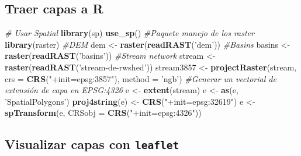 \documentclass[11pt,]{article}
\newenvironment{Shaded}{\begin{snugshade}}{\end{snugshade}}
\newcommand{\KeywordTok}[1]{\textcolor[rgb]{0.13,0.29,0.53}{\textbf{#1}}}
\newcommand{\DataTypeTok}[1]{\textcolor[rgb]{0.13,0.29,0.53}{#1}}
\newcommand{\StringTok}[1]{\textcolor[rgb]{0.31,0.60,0.02}{#1}}
\newcommand{\CommentTok}[1]{\textcolor[rgb]{0.56,0.35,0.01}{\textit{#1}}}
\newcommand{\NormalTok}[1]{#1}
\begin{document}
\subsection{Traer capas a R}\label{traer-capas-a-r}

\begin{Shaded}
\begin{Highlighting}[]
\CommentTok{# Usar Spatial }
\KeywordTok{library}\NormalTok{(sp)}
\KeywordTok{use_sp}\NormalTok{()}
\CommentTok{#Paquete manejo de los raster}
\KeywordTok{library}\NormalTok{(raster)}
\CommentTok{#DEM}
\NormalTok{dem <-}\StringTok{ }\KeywordTok{raster}\NormalTok{(}\KeywordTok{readRAST}\NormalTok{(}\StringTok{'dem'}\NormalTok{))}
\CommentTok{#Basins}
\NormalTok{basins <-}\StringTok{ }\KeywordTok{raster}\NormalTok{(}\KeywordTok{readRAST}\NormalTok{(}\StringTok{'basins'}\NormalTok{))}
\CommentTok{#Stream network}
\NormalTok{stream <-}\StringTok{ }\KeywordTok{raster}\NormalTok{(}\KeywordTok{readRAST}\NormalTok{(}\StringTok{'stream-de-rwshed'}\NormalTok{))}
\NormalTok{stream3857 <-}\StringTok{ }\KeywordTok{projectRaster}\NormalTok{(stream, }\DataTypeTok{crs =} \KeywordTok{CRS}\NormalTok{(}\StringTok{"+init=epsg:3857"}\NormalTok{), }\DataTypeTok{method =} \StringTok{'ngb'}\NormalTok{)}
\CommentTok{#Generar un vectorial de extensión de capa en EPSG:4326}
\NormalTok{e <-}\StringTok{ }\KeywordTok{extent}\NormalTok{(stream)}
\NormalTok{e <-}\StringTok{ }\KeywordTok{as}\NormalTok{(e, }\StringTok{'SpatialPolygons'}\NormalTok{)}
\KeywordTok{proj4string}\NormalTok{(e) <-}\StringTok{ }\KeywordTok{CRS}\NormalTok{(}\StringTok{"+init=epsg:32619"}\NormalTok{)}
\NormalTok{e <-}\StringTok{ }\KeywordTok{spTransform}\NormalTok{(e, }\DataTypeTok{CRSobj =} \KeywordTok{CRS}\NormalTok{(}\StringTok{"+init=epsg:4326"}\NormalTok{))}
\end{Highlighting}
\end{Shaded}

\subsection{\texorpdfstring{Visualizar capas con
\texttt{leaflet}}{Visualizar capas con leaflet}}\label{visualizar-capas-con-leaflet}
\end{document}
